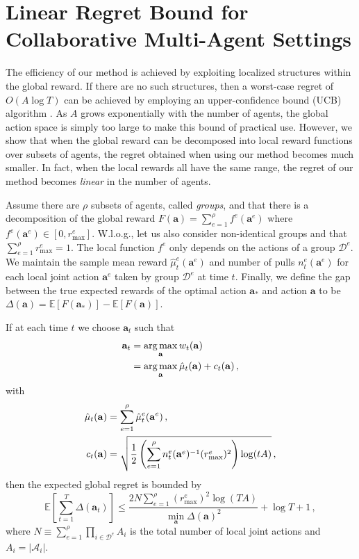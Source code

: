 \section{Linear Regret Bound for Collaborative Multi-Agent Settings}
\label{sec:regret}

The efficiency of our method is achieved by exploiting localized structures within the global reward. If there are no such structures, then a worst-case regret of $O(A \log T)$ can be achieved by employing an upper-confidence bound (UCB) algorithm \cite{auer2002finite,auer2010ucb}.
As $A$ grows exponentially with the number of agents, the global action space is simply too large to make this bound of practical use. However, we show that when the global reward can be decomposed into local reward functions over subsets of agents, the regret obtained when using our method becomes much smaller. In fact, when the local rewards all have the same range, the regret of our method becomes \emph{linear} in the number of agents.

Assume there are $\rho$ subsets of agents, called \emph{groups}, and that there is a decomposition of the global reward $F(\mathbf{a}) = \sum^\rho_{e=1} f^e(\mathbf{a}^e)$ where $f^e(\mathbf{a}^e) \in \left[0, r_{\max}^e\right]$. W.l.o.g., let us also consider non-identical groups and that $\sum^\rho_{e=1} r_{\max}^e = 1$. The local function $f^e$ only depends on the actions of a group $\mathcal{D}^e$. We maintain the sample mean reward $\hat{\mu}^e_{t}(\mathbf{a}^e)$ and number of pulls $n^e_{t}(\mathbf{a}^e)$ for each local joint action $\mathbf{a}^e$ taken by group $\mathcal{D}^e$ at time $t$. Finally, we define the gap between the true expected rewards of the optimal action $\mathbf{a_*}$ and action $\mathbf{a}$ to be $\Delta(\mathbf{a}) = \mathbb{E}\left[F(\mathbf{a_*})\right] - \mathbb{E}\left[F(\mathbf{a})\right]$.

\begin{theorem}
If at each time $t$ we choose $\mathbf{a}_t$ such that
\begin{equation*}
\begin{split}
\mathbf{a}_t &= \operatorname*{arg\,max}_\mathbf{a} w_t(\mathbf{a})\\
&= \operatorname*{arg\,max}_\mathbf{a} \hat{\mu}_t(\mathbf{a}) + c_t(\mathbf{a})\,,
\end{split}
\end{equation*}
with
\begin{align*}
\hat{\mu}_t(\mathbf{a})
& = \sum_{e=1}^\rho \hat{\mu}^e_t(\mathbf{a}^e) \,, \\
c_t(\mathbf{a}) & = \sqrt{ \frac{1}{2} \left(\sum_{e=1}^\rho n^e_t(\mathbf{a}^e)^{-1} (r_{\max}^e)^2 \right) \log ( t A )} \,,
\end{align*}
then the expected global regret is bounded by
\[
\mathbb{E} \left[ \sum_{t=1}^T \Delta(\mathbf{a}_t) \right] \le\frac{2 N \sum_{e=1}^\rho (r_{\max}^e)^2 \log ( T A )}{\min_\mathbf{a} \Delta(\mathbf{a})^2} + \log T + 1 \,,
\]
where $N \equiv \sum_{e=1}^\rho \prod_{i \in \mathcal{D}^e} A_i$ is the total number of local joint actions and $A_i = |\mathcal{A}_i|$.
\end{theorem}

